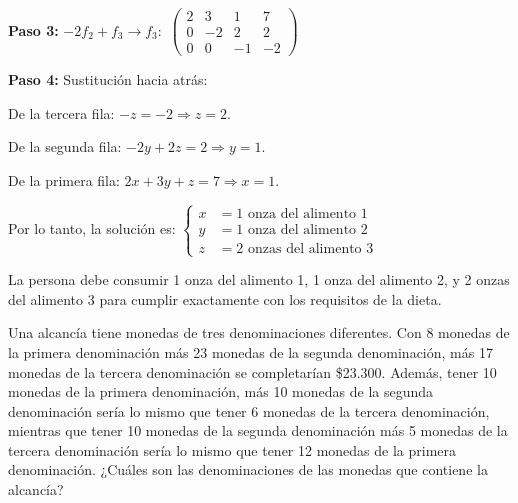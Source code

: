\begin{myproof}
\textbf{Paso 3:} $-2f_2 + f_3 \to f_3:$ $\left(\begin{array}{ccc|c}
2 & 3 & 1 & 7 \\
0 & -2 & 2 & 2 \\
0 & 0 & -1 & -2
\end{array}\right)$

\textbf{Paso 4:} Sustitución hacia atrás:

De la tercera fila: $-z = -2\Rightarrow z = 2.$

De la segunda fila: $-2y + 2z = 2\Rightarrow y = 1.$

De la primera fila: $2x + 3y + z = 7\Rightarrow x = 1.$

Por lo tanto, la solución es:
$\begin{cases}
x &= 1 \text{ onza del alimento 1}\\
y &= 1 \text{ onza del alimento 2}\\
z &= 2 \text{ onzas del alimento 3}
\end{cases}$

La persona debe consumir 1 onza del alimento 1, 1 onza del alimento 2, y 2 onzas del alimento 3 para cumplir exactamente con los requisitos de la dieta.
\end{myproof}

\begin{prob}
Una alcancía tiene monedas de tres denominaciones diferentes. Con 8 monedas de la primera denominación más 23 monedas de la segunda denominación, más 17 monedas de la tercera denominación se completarían \$23.300. Además, tener 10 monedas de la primera denominación, más 10 monedas de la segunda denominación sería lo mismo que tener 6 monedas de la tercera denominación, mientras que tener 10 monedas de la segunda denominación más 5 monedas de la tercera denominación sería lo mismo que tener 12 monedas de la primera denominación. ¿Cuáles son las denominaciones de las monedas que contiene la alcancía?
\end{prob}


